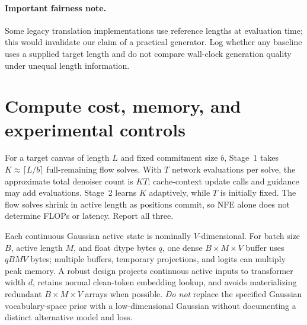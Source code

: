 \documentclass[11pt,a4paper]{article}
\begin{document}
\paragraph{Important fairness note.}
Some legacy translation implementations use reference lengths at evaluation time; this would invalidate our claim of a practical generator. Log whether any baseline uses a supplied target length and do not compare wall-clock generation quality under unequal length information.

\section{Compute cost, memory, and experimental controls}
For a target canvas of length $L$ and fixed commitment size $b$, Stage~1 takes $K\approx\lceil L/b\rceil$ full-remaining flow solves. With $T$ network evaluations per solve, the approximate total denoiser count is $KT$; cache-context update calls and guidance may add evaluations. Stage~2 learns $K$ adaptively, while $T$ is initially fixed. The flow solves shrink in active length as positions commit, so NFE alone does not determine FLOPs or latency. Report all three.

Each continuous Gaussian active state is nominally $V$-dimensional. For batch size $B$, active length $M$, and float dtype bytes $q$, one dense $B\times M\times V$ buffer uses $qBMV$ bytes; multiple buffers, temporary projections, and logits can multiply peak memory. A robust design projects continuous active inputs to transformer width $d$, retains normal clean-token embedding lookup, and avoids materializing redundant $B\times M\times V$ arrays when possible. \emph{Do not} replace the specified Gaussian vocabulary-space prior with a low-dimensional Gaussian without documenting a distinct alternative model and loss.
\end{document}

